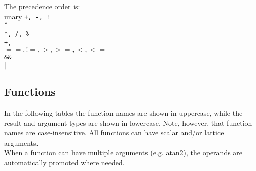\begin{description}
  \item The precedence order is:
       \\unary \texttt{+, -, !}
       \\\verb+^+
       \\\texttt{*, /, \%}
       \\\texttt{+, -}
       \\\texttt{$==, !=, >, >=, <, <=$}
       \\\texttt{\&\&}
       \\\texttt{$\mid\mid$}
\end{description}

\subsection{\label{LEL:FUNCTIONS}Functions}
In the following tables the function names are shown in uppercase,
while the result and argument types are shown in lowercase.
Note, however, that function names are case-insensitive.
All functions can have scalar and/or lattice arguments.
\\When a function can have multiple arguments (e.g. atan2), the
operands are automatically promoted where needed.

